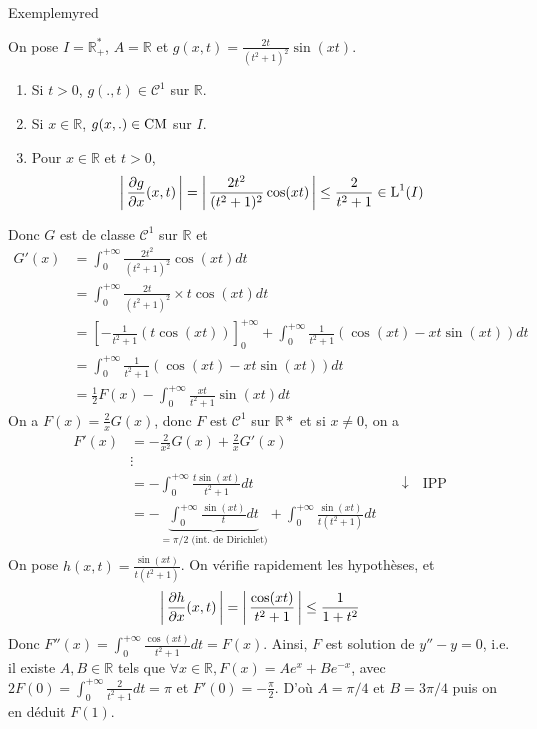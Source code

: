 \begin{omed}{Exemple}{myred}
\begin{itemize}
            On pose $I = \mathbb{R}^*_+$, $A = \mathbb{R}$ et $g(x,t) = \frac{2t}{(t^2 + 1)^2} \sin(xt)$.
            \begin{enumerate}
                \item Si $t > 0$, $g(.,t) \in \mathcal{C}^1$ sur $\mathbb{R}$.
                \item Si $x \in \mathbb{R}$, $g(x,.) \in \operatorname{CM}$ sur $I$.
                \item Pour $x \in \mathbb{R}$ et $t > 0$, 
                \[ \left\lvert \,\frac{\partial g}{\partial x}(x,t) \, \right\rvert = \left\lvert \,\frac{2t^2}{(t^2 + 1)^2} \cos(xt) \, \right\rvert \leq \frac{2}{t^2 + 1} \in \operatorname{L}^1(I) \]   
            \end{enumerate}
            Donc $G$ est de classe $\mathcal{C}^1$ sur $\mathbb{R}$ et 
            \begin{align*}
                G'(x) &= \int_{0}^{+\infty} \frac{2t^2}{(t^2 + 1)^2} \cos(xt) dt \\
                &= \int_{0}^{+\infty} \frac{2t}{(t^2 + 1)^2} \times t \cos(xt) dt \\
                &= \left[-\frac{1}{t^2 + 1}(t \cos(xt))\right]_0^{+\infty} + \int_{0}^{+\infty} \frac{1}{t^2 + 1} (\cos(xt) - xt \sin(xt)) dt \\
                &= \int_{0}^{+\infty} \frac{1}{t^2 + 1} \left(\cos(xt) - xt \sin(xt)\right)dt \\
                &= \frac{1}{2} F(x) - \int_{0}^{+\infty} \frac{xt}{t^2 + 1} \sin(xt) dt 
            \end{align*}
            On a $F(x) = \frac{2}{x} G(x)$, donc $F$ est $\mathcal{C}^1$ sur $\mathbb{R}*$ et si $x \neq 0$, on a 
            \begin{align*}
                F'(x) &= -\frac{2}{x^2} G(x) + \frac{2}{x} G'(x) \\
                    &\vdots \\
                    &= - \int_{0}^{+\infty} \frac{t \sin(xt)}{t^2 + 1} dt 
                    &\quad \downarrow \quad \text{IPP} \\
                    &= - \underbrace{\int_{0}^{+\infty} \frac{\sin(xt)}{t} dt}_{= \pi / 2 \text{ (int. de Dirichlet)}} + \int_{0}^{+\infty} \frac{\sin(xt)}{t(t^2 + 1)} dt \\
            \end{align*}
            On pose $h(x,t) = \frac{\sin(xt)}{t(t^2 + 1)}$. On vérifie rapidement les hypothèses, et 
            \[ \left\lvert \,\frac{\partial h}{\partial x}(x,t) \, \right\rvert = \left\lvert \,\frac{\cos(xt)}{t^2 + 1} \, \right\rvert \leq \frac{1}{1 + t^2} \]   
            Donc $F''(x) = \int_{0}^{+\infty} \frac{\cos(xt)}{t^2 + 1} dt = F(x)$. Ainsi, $F$ est solution de $y'' - y = 0$, i.e. il existe $A,B \in \mathbb{R}$ tels que $\forall x \in \mathbb{R}, F(x) = Ae^x + Be^{-x}$, avec $2 F(0) = \int_{0}^{+\infty} \frac{2}{t^2 + 1} dt = \pi$ et $F'(0) = -\frac{\pi}{2}$. D’où $A = \pi / 4$ et $B = 3 \pi /4$ puis on en déduit $F(1)$.
        \end{itemize}
    \end{omed}

